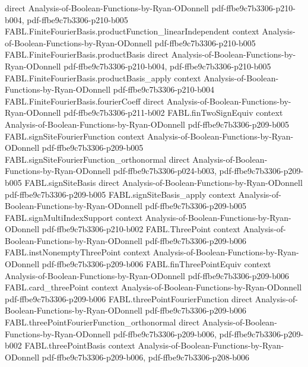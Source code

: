 \begin{theorem}
  {direct}
  {Analysis-of-Boolean-Functions-by-Ryan-ODonnell}
  {pdf-ffbe9c7b3306-p210-b004,
    pdf-ffbe9c7b3306-p210-b005}
\proofstep
  {FABL.FiniteFourierBasis.productFunction_linearIndependent}
  {context}
  {Analysis-of-Boolean-Functions-by-Ryan-ODonnell}
  {pdf-ffbe9c7b3306-p210-b005}
\proofstep
  {FABL.FiniteFourierBasis.productBasis}
  {direct}
  {Analysis-of-Boolean-Functions-by-Ryan-ODonnell}
  {pdf-ffbe9c7b3306-p210-b004,
    pdf-ffbe9c7b3306-p210-b005}
\proofstep
  {FABL.FiniteFourierBasis.productBasis_apply}
  {context}
  {Analysis-of-Boolean-Functions-by-Ryan-ODonnell}
  {pdf-ffbe9c7b3306-p210-b004}
\proofstep
  {FABL.FiniteFourierBasis.fourierCoeff}
  {direct}
  {Analysis-of-Boolean-Functions-by-Ryan-ODonnell}
  {pdf-ffbe9c7b3306-p211-b002}
\proofstep
  {FABL.finTwoSignEquiv}
  {context}
  {Analysis-of-Boolean-Functions-by-Ryan-ODonnell}
  {pdf-ffbe9c7b3306-p209-b005}
\proofstep
  {FABL.signSiteFourierFunction}
  {context}
  {Analysis-of-Boolean-Functions-by-Ryan-ODonnell}
  {pdf-ffbe9c7b3306-p209-b005}
\proofstep
  {FABL.signSiteFourierFunction_orthonormal}
  {direct}
  {Analysis-of-Boolean-Functions-by-Ryan-ODonnell}
  {pdf-ffbe9c7b3306-p024-b003,
    pdf-ffbe9c7b3306-p209-b005}
\proofstep
  {FABL.signSiteBasis}
  {direct}
  {Analysis-of-Boolean-Functions-by-Ryan-ODonnell}
  {pdf-ffbe9c7b3306-p209-b005}
\proofstep
  {FABL.signSiteBasis_apply}
  {context}
  {Analysis-of-Boolean-Functions-by-Ryan-ODonnell}
  {pdf-ffbe9c7b3306-p209-b005}
\proofstep
  {FABL.signMultiIndexSupport}
  {context}
  {Analysis-of-Boolean-Functions-by-Ryan-ODonnell}
  {pdf-ffbe9c7b3306-p210-b002}
\proofstep
  {FABL.ThreePoint}
  {context}
  {Analysis-of-Boolean-Functions-by-Ryan-ODonnell}
  {pdf-ffbe9c7b3306-p209-b006}
\proofstep
  {FABL.instNonemptyThreePoint}
  {context}
  {Analysis-of-Boolean-Functions-by-Ryan-ODonnell}
  {pdf-ffbe9c7b3306-p209-b006}
\proofstep
  {FABL.finThreePointEquiv}
  {context}
  {Analysis-of-Boolean-Functions-by-Ryan-ODonnell}
  {pdf-ffbe9c7b3306-p209-b006}
\proofstep
  {FABL.card_threePoint}
  {context}
  {Analysis-of-Boolean-Functions-by-Ryan-ODonnell}
  {pdf-ffbe9c7b3306-p209-b006}
\proofstep
  {FABL.threePointFourierFunction}
  {direct}
  {Analysis-of-Boolean-Functions-by-Ryan-ODonnell}
  {pdf-ffbe9c7b3306-p209-b006}
\proofstep
  {FABL.threePointFourierFunction_orthonormal}
  {direct}
  {Analysis-of-Boolean-Functions-by-Ryan-ODonnell}
  {pdf-ffbe9c7b3306-p209-b006,
    pdf-ffbe9c7b3306-p209-b002}
\proofstep
  {FABL.threePointBasis}
  {context}
  {Analysis-of-Boolean-Functions-by-Ryan-ODonnell}
  {pdf-ffbe9c7b3306-p209-b006,
    pdf-ffbe9c7b3306-p208-b006}

\end{theorem}
